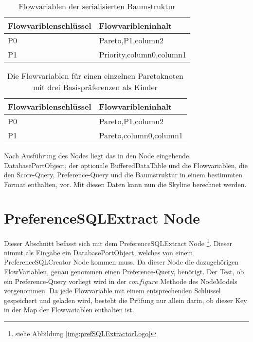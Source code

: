 \begin{table}[H]
  \centering
  \begin{tabular}{|M{4cm}|M{10cm}|}
    \hline 
    Flowvariblenschlüssel & Flowvaribleninhalt \\ \hline 
    P0 &  Pareto,P1,column2 \\ \hline
    P1 & Priority,column0,column1\\ \hline
  \end{tabular}
  \newline\newline
  \caption{Flowvariablen der serialisierten Baumstruktur}\label{tbl:serialization}
\end{table} 

\begin{table}[H]
  \centering
  \begin{tabular}{|M{4cm}|M{10cm}|}
    \hline   
    Flowvariblenschlüssel & Flowvaribleninhalt \\ \hline 
    P0 &  Pareto,P1,column2 \\ \hline
    P1 & Pareto,column0,column1\\ \hline
  \end{tabular}
  \newline\newline
  \caption{Die Flowvariablen für einen einzelnen Paretoknoten mit drei Basispräferenzen als Kinder}\label{tbl:threeChilds}
\end{table}

Nach Ausführung des Nodes liegt das in den Node eingehende DatabasePortObject, der optionale BufferedDataTable und die Flowvariablen, die den Score-Query, Preference-Query und die Baumstruktur in einem bestimmten Format enthalten, vor.
Mit diesen Daten kann nun die Skyline berechnet werden.
\section{PreferenceSQLExtract Node}
\label{ch:Implementierung:sec:prefSQLExtract}
Dieser Abschnitt befasst sich mit dem PreferenceSQLExtract Node \footnote{siehe Abbildung \ref{img:prefSQLExtractorLogo}}. Dieser nimmt als Eingabe ein DatabasePortObject, welches von einem PreferenceSQLCreator Node kommen muss. Da dieser Node die dazugehörigen FlowVariablen, genau genommen einen Preference-Query, benötigt.
Der Test, ob ein Preference-Query vorliegt wird in der $configure$ Methode des NodeModels vorgenommen. Da jede Flowvariable mit einem entsprechenden Schlüssel gespeichert und geladen wird, besteht die Prüfung nur allein darin, ob dieser Key in der Map der Flowvariablen enthalten ist.  

